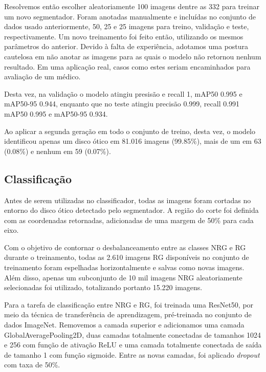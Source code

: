 \documentclass[12pt]{article}
\begin{document}
Resolvemos então escolher aleatoriamente 100 imagens dentre as 332 para treinar um novo segmentador. Foram anotadas manualmente e incluídas no conjunto de dados usado anteriormente, 50, 25 e 25 imagens para treino, validação e teste, respectivamente. Um novo treinamento foi feito então, utilizando os mesmos parâmetros do anterior. Devido à falta de experiência, adotamos uma postura cautelosa em não anotar as imagens para as quais o modelo não retornou nenhum resultado. Em uma aplicação real, casos como estes seriam encaminhados para avaliação de um médico. 

Desta vez, na validação o modelo atingiu presisão e recall 1, mAP50 0.995 e mAP50-95 0.944, enquanto que no teste atingiu precisão 0.999, recall 0.991 mAP50 0.995 e mAP50-95 0.934.

Ao aplicar a segunda geração em todo o conjunto de treino, desta vez, o modelo identificou apenas um disco ótico em 81.016 imagens (99.85\%), mais de um em 63 (0.08\%) e nenhum em 59 (0.07\%).


\subsection{Classificação}
\label{sec:classification}

Antes de serem utilizadas no classificador, todas as imagens foram cortadas no entorno do disco ótico detectado pelo segmentador. A região do corte foi definida com as coordenadas retornadas, adicionadas de uma margem de 50\% para cada eixo.

Com o objetivo de contornar o desbalanceamento entre as classes NRG e RG durante o treinamento, todas as 2.610 imagens RG disponíveis no conjunto de treinamento foram espelhadas horizontalmente e salvas como novas imagens. Além disso, apenas um subconjunto de 10 mil imagens NRG aleatoriamente selecionadas foi utilizado, totalizando portanto 15.220 imagens.


Para a tarefa de classificação entre NRG e RG, foi treinada uma ResNet50, por meio da técnica de transferência de aprendizagem, pré-treinada no conjunto de dados ImageNet. Removemos a camada superior e adicionamos uma camada GlobalAveragePooling2D, duas camadas totalmente conectadas de tamanhos 1024 e 256 com função de ativação ReLU e uma camada totalmente conectada de saída de tamanho 1 com função sigmoide. Entre as novas camadas, foi aplicado \emph{dropout} com taxa de 50\%.
\end{document}
